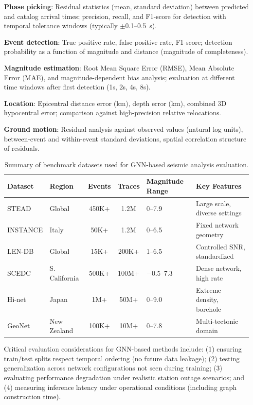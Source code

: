 \documentclass[review,authoryear]{elsarticle}
\begin{document}
\textbf{Phase picking}: Residual statistics (mean, standard deviation) between predicted and catalog arrival times; precision, recall, and F1-score for detection with temporal tolerance windows (typically $\pm$0.1--0.5~s).

\textbf{Event detection}: True positive rate, false positive rate, F1-score; detection probability as a function of magnitude and distance (magnitude of completeness).

\textbf{Magnitude estimation}: Root Mean Square Error (RMSE), Mean Absolute Error (MAE), and magnitude-dependent bias analysis; evaluation at different time windows after first detection (1s, 2s, 4s, 8s).

\textbf{Location}: Epicentral distance error (km), depth error (km), combined 3D hypocentral error; comparison against high-precision relative relocations.

\textbf{Ground motion}: Residual analysis against observed values (natural log units), between-event and within-event standard deviations, spatial correlation structure of residuals.

\begin{table}[htbp]
\centering
\caption{Summary of benchmark datasets used for GNN-based seismic analysis evaluation.}
\label{tab:datasets}
\small
\begin{tabular}{p{2cm}p{2cm}ccp{2cm}p{2.5cm}}
\toprule
\textbf{Dataset} & \textbf{Region} & \textbf{Events} & \textbf{Traces} & \textbf{Magnitude Range} & \textbf{Key Features} \\
\midrule
STEAD & Global & 450K+ & 1.2M & 0--7.9 & Large scale, diverse settings \\
INSTANCE & Italy & 50K+ & 1.2M & 0--6.5 & Fixed network geometry \\
LEN-DB & Global & 15K+ & 200K+ & 1--6.5 & Controlled SNR, standardized \\
SCEDC & S. California & 500K+ & 100M+ & $-$0.5--7.3 & Dense network, high rate \\
Hi-net & Japan & 1M+ & 50M+ & 0--9.0 & Extreme density, borehole \\
GeoNet & New Zealand & 100K+ & 10M+ & 0--7.8 & Multi-tectonic domain \\
\bottomrule
\end{tabular}
\end{table}

Critical evaluation considerations for GNN-based methods include: (1) ensuring train/test splits respect temporal ordering (no future data leakage); (2) testing generalization across network configurations not seen during training; (3) evaluating performance degradation under realistic station outage scenarios; and (4) measuring inference latency under operational conditions (including graph construction time).
\end{document}
